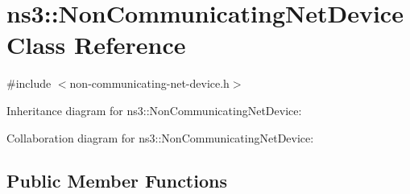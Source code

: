 \hypertarget{classns3_1_1NonCommunicatingNetDevice}{}\section{ns3\+:\+:Non\+Communicating\+Net\+Device Class Reference}
\label{classns3_1_1NonCommunicatingNetDevice}


{\ttfamily \#include $<$non-\/communicating-\/net-\/device.\+h$>$}



Inheritance diagram for ns3\+:\+:Non\+Communicating\+Net\+Device\+:


Collaboration diagram for ns3\+:\+:Non\+Communicating\+Net\+Device\+:
\subsection*{Public Member Functions}
